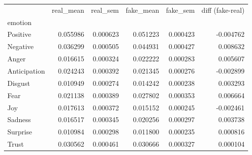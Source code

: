 \begin{tabular}{lrrrrr}
\toprule
 & real_mean & real_sem & fake_mean & fake_sem & diff (fake-real) \\
emotion &  &  &  &  &  \\
\midrule
Positive & 0.055986 & 0.000623 & 0.051223 & 0.000423 & -0.004762 \\
Negative & 0.036299 & 0.000505 & 0.044931 & 0.000427 & 0.008632 \\
Anger & 0.016615 & 0.000324 & 0.022222 & 0.000283 & 0.005607 \\
Anticipation & 0.024243 & 0.000392 & 0.021345 & 0.000276 & -0.002899 \\
Disgust & 0.010949 & 0.000274 & 0.014242 & 0.000238 & 0.003293 \\
Fear & 0.021138 & 0.000389 & 0.027802 & 0.000353 & 0.006664 \\
Joy & 0.017613 & 0.000372 & 0.015152 & 0.000245 & -0.002461 \\
Sadness & 0.016517 & 0.000345 & 0.020256 & 0.000297 & 0.003738 \\
Surprise & 0.010984 & 0.000298 & 0.011800 & 0.000235 & 0.000816 \\
Trust & 0.030562 & 0.000461 & 0.030666 & 0.000327 & 0.000104 \\
\bottomrule
\end{tabular}

